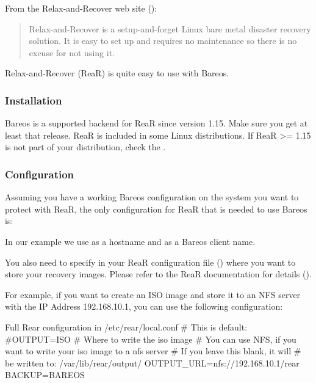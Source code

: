 From the Relax-and-Recover web site
():
\begin{quote}
 Relax-and-Recover is a setup-and-forget Linux bare metal disaster recovery
solution.
It is easy to set up and requires no maintenance so there is no excuse for not
using it.
\end{quote}
Relax-and-Recover (ReaR) is quite easy to use with Bareos.

\subsubsection{Installation}
Bareos is a supported backend for ReaR since version 1.15. 
Make sure you get at least that release.
ReaR is included in some Linux distributions.
If ReaR \textgreater= 1.15 is not part of your distribution, 
check the .

\subsubsection{Configuration}
Assuming you have a working Bareos configuration on the system you want to
protect with ReaR, the only configuration for ReaR that is needed to use Bareos
is:



In our example we use  as a
hostname and  as a Bareos client name.

You also need to specify in your ReaR configuration file
()
where
you want to store your recovery images. Please refer to the ReaR documentation
for details
().

For example, if you want to create an ISO
image and store it to an NFS server
with the IP Address 192.168.10.1, you can use the following configuration:

\begin{config}{Full Rear configuration in /etc/rear/local.conf}
# This is default:
#OUTPUT=ISO
# Where to write the iso image
# You can use NFS, if you want to write your iso image to a nfs server
# If you leave this blank, it will
# be written to: /var/lib/rear/output/
OUTPUT_URL=nfs://192.168.10.1/rear
BACKUP=BAREOS
\end{config}

